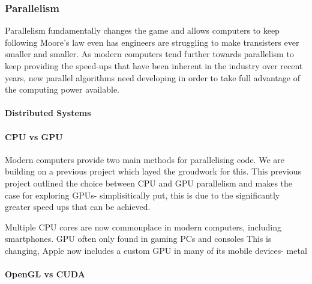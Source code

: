 \documentclass{UoYCSproject}
\begin{document}
\subsubsection{Parallelism}

Parallelism fundamentally changes the game and allows computers to keep following Moore's law even has engineers are struggling to make transisters ever smaller and smaller\cite{concurrency_revolution}. As modern computers tend further towards parallelism to keep providing the speed-ups that have been inherent in the industry over recent years, new parallel algorithms need developing in order to take full advantage of the computing power available.

\paragraph{Distributed Systems}

\paragraph{CPU vs GPU}
Modern computers provide two main methods for parallelising code.
We are building on a previous project\cite{phil_diss} which layed the groudwork for this.
This previous project outlined the choice between CPU and GPU parallelism and makes the case for exploring GPUs- simplisitically put, this is due to the significantly greater speed ups that can be achieved.

Multiple CPU cores are now commonplace in modern computers, including smartphones.
GPU often only found in gaming PCs and consoles
This is changing, Apple now includes a custom GPU in many of its mobile devices- metal



\paragraph{OpenGL vs CUDA}
\end{document}
